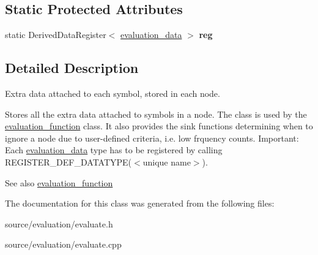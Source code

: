 \subsection*{Static Protected Attributes}
\begin{DoxyCompactItemize}
\item 
\mbox{\label{classevaluation__data_aab122a205d97fd47be8f59e49804e6de}} 
static Derived\+Data\+Register$<$ \hyperlink{classevaluation__data}{evaluation\+\_\+data} $>$ {\bfseries reg}
\end{DoxyCompactItemize}


\subsection{Detailed Description}
Extra data attached to each symbol, stored in each node. 

Stores all the extra data attached to symbols in a node. The class is used by the \hyperlink{classevaluation__function}{evaluation\+\_\+function} class. It also provides the sink functions determining when to ignore a node due to user-\/defined criteria, i.\+e. low frquency counts. Important\+: Each \hyperlink{classevaluation__data}{evaluation\+\_\+data} type has to be registered by calling R\+E\+G\+I\+S\+T\+E\+R\+\_\+\+D\+E\+F\+\_\+\+D\+A\+T\+A\+T\+Y\+P\+E($<$unique name$>$). \begin{DoxySeeAlso}{See also}
\hyperlink{classevaluation__function}{evaluation\+\_\+function} 
\end{DoxySeeAlso}


The documentation for this class was generated from the following files\+:\begin{DoxyCompactItemize}
\item 
source/evaluation/evaluate.\+h\item 
source/evaluation/evaluate.\+cpp\end{DoxyCompactItemize}
